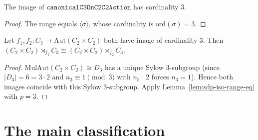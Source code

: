 \begin{lemma}
    \label{lem:canonicalC3OnC2C2-range}
    The image of $\mathtt{canonicalC3OnC2C2Action}$ has cardinality $3$.
\end{lemma}
\begin{proof}
    The range equals $\langle \sigma \rangle$, whose cardinality is
    $\mathrm{ord}(\sigma) = 3$.
\end{proof}

\begin{lemma}
    \label{lem:sdp-C3-on-C2C2-iso}
    Let $f_1, f_2 : C_3 \to \mathrm{Aut}(C_2 \times C_2)$ both have image of
    cardinality $3$. Then $(C_2 \times C_2) \rtimes_{f_1} C_3 \cong
    (C_2 \times C_2) \rtimes_{f_2} C_3$.
\end{lemma}
\begin{proof}
    $\mathrm{MulAut}(C_2 \times C_2) \cong D_3$ has a unique Sylow
    $3$-subgroup (since $|D_3| = 6 = 3 \cdot 2$ and $n_3 \equiv 1
    \pmod 3$ with $n_3 \mid 2$ forces $n_3 = 1$). Hence both images coincide
    with this Sylow $3$-subgroup. Apply
    Lemma~\ref{lem:sdp-iso-range-eq} with $p = 3$.
\end{proof}

\section{The main classification}


